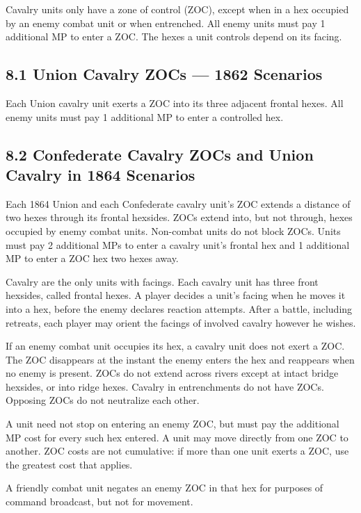 
Cavalry units only have a zone of control (ZOC), except when in a hex occupied by an enemy combat unit or when entrenched. All enemy units must pay 1 additional MP to enter a ZOC. The hexes a unit controls depend on its facing.

\subsection[8.1 Union Cavalry ZOCs --- 1862]{8.1 Union Cavalry ZOCs --- 1862 Scenarios}

Each Union cavalry unit exerts a ZOC into its three adjacent frontal hexes. All enemy units must pay 1 additional MP to enter a controlled hex.

\subsection[8.2 Cavalry ZOCs - 1864]{8.2 Confederate Cavalry ZOCs and Union Cavalry in 1864 Scenarios}

Each 1864 Union and each Confederate cavalry unit's ZOC extends a distance of two hexes through its frontal hexsides. ZOCs extend into, but not through, hexes occupied by enemy combat units. Non-combat units do not block ZOCs. Units must pay 2 additional MPs to enter a cavalry unit's frontal hex and 1 additional MP to enter a ZOC hex two hexes away.


Cavalry are the only units with facings. Each cavalry unit has three front hexsides, called frontal hexes. A player decides a unit's facing when he moves it into a hex, before the enemy declares reaction attempts. After a battle, including retreats, each player may orient the facings of involved cavalry however he wishes.


If an enemy combat unit occupies its hex, a cavalry unit does not exert a ZOC. The ZOC disappears at the instant the enemy enters the hex and reappears when no enemy is present. ZOCs do not extend across rivers except at intact bridge hexsides, or into ridge hexes. Cavalry in entrenchments do not have ZOCs. Opposing ZOCs do not neutralize each other.


A unit need not stop on entering an enemy ZOC, but must pay the additional MP cost for every such hex entered. A unit may move directly from one ZOC to another. ZOC costs are not cumulative: if more than one unit exerts a ZOC, use the greatest cost that applies.

A friendly combat unit negates an enemy ZOC in that hex for purposes of command broadcast, but not for movement.
